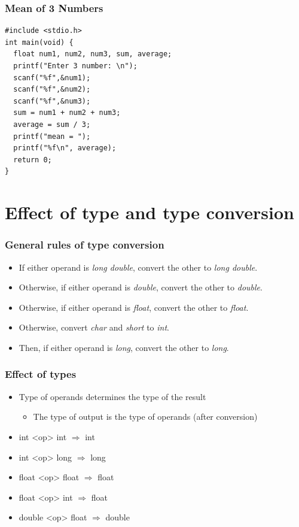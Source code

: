 \documentclass{../c-lecture}
\begin{document}
\begin{frame}[fragile]
  \frametitle{Mean of 3 Numbers}
  \begin{verbatim}
#include <stdio.h>
int main(void) {
  float num1, num2, num3, sum, average;
  printf("Enter 3 number: \n");
  scanf("%f",&num1);
  scanf("%f",&num2);
  scanf("%f",&num3);
  sum = num1 + num2 + num3;
  average = sum / 3;
  printf("mean = ");
  printf("%f\n", average);
  return 0;
}
  \end{verbatim}
\end{frame}

\section{Effect of type and type conversion}

\begin{frame}
  \frametitle{General rules of type conversion}
  \begin{itemize}
    \item
      If either operand is \textit{\color{Orange} long double},
      convert the other to \textit{\color{Orange} long double}.

    \item
      Otherwise, if either operand is \textit{\color{LimeGreen} double},
      convert the other to \textit{\color{LimeGreen} double}.

    \item
      Otherwise, if either operand is \textit{\color{Cyan} float},
      convert the other to \textit{\color{Cyan} float}.

    \item
      Otherwise, convert \textit{\color{Orange} char} and
      \textit{\color{Orange} short} to
      \textit{\color{Orange} int}.

    \item
      Then, if either operand is \textit{\color{LimeGreen} long}, convert
      the other to \textit{\color{LimeGreen} long}.
  \end{itemize}
\end{frame}

\begin{frame}
  \frametitle{Effect of types}
  \begin{itemize}
    \item Type of operands determines the type of the result
    \begin{itemize}
      \item The type of output is the type of operands (after conversion)
    \end{itemize}
    \item int <op> int $\Rightarrow$ int
    \item int <op> long $\Rightarrow$ long
    \item float <op> float $\Rightarrow$ float
    \item float <op> int $\Rightarrow$ float
    \item double <op> float $\Rightarrow$ double
  \end{itemize}
\end{frame}
\end{document}
